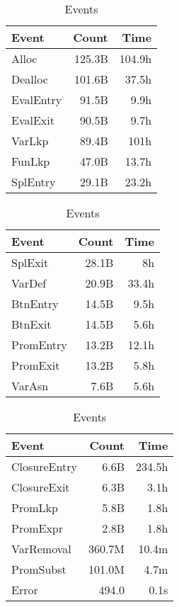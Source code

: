 \documentclass[review,nonacm,screen,acmsmall,anonymous=true]{acmart}
\begin{document}
\begin{table}[!h]
  \vspace{-3mm}
  \small
  \caption{Events} \label{table:events}
  \centering
  \begin{tabular}{lrr}
    \toprule
    \bf Event&\bf Count& \bf Time\\
    \midrule
    Alloc&125.3B&104.9h\\
    Dealloc&101.6B&37.5h\\
    EvalEntry&91.5B&9.9h\\
    EvalExit&90.5B&9.7h\\
    VarLkp&89.4B&101h\\
    FunLkp&47.0B&13.7h\\
    SplEntry&29.1B&23.2h\\
    \bottomrule
  \end{tabular}
  \begin{tabular}{lrr}
    \toprule
    \bf Event&\bf Count& \bf Time\\
    \midrule
    SplExit&28.1B&8h\\
    VarDef&20.9B&33.4h\\
    BtnEntry&14.5B&9.5h\\
    BtnExit&14.5B&5.6h\\
    PromEntry&13.2B&12.1h\\
    PromExit&13.2B&5.8h\\
    VarAsn&7.6B&5.6h\\
    \bottomrule
  \end{tabular}
  \begin{tabular}{lrr}
    \toprule
    \bf Event&\bf Count& \bf Time\\
    \midrule
    ClosureEntry&6.6B&234.5h\\
    ClosureExit&6.3B&3.1h\\
    PromLkp&5.8B&1.8h\\
    PromExpr&2.8B&1.8h\\
    VarRemoval&360.7M&10.4m\\
    PromSubst&101.0M&4.7m\\
    Error&494.0&0.1s\\
    \bottomrule
  \end{tabular}
\end{table}
\end{document}
